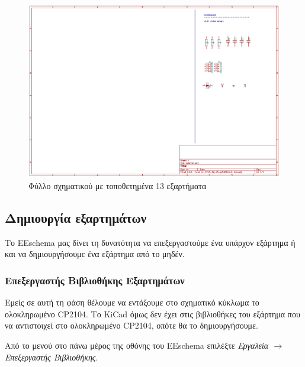 \documentclass[a4paper]{article}
\begin{document}
\begin{figure}
  \begin{center}
    \includegraphics[width=.9\textwidth]{img/eesch-circ-placedccompcop.png}
    \caption{Φύλλο σχηματικού με τοποθετημένα 13 εξαρτήματα}
    \label{fig:eesch-circ-placedccompcop}
  \end{center}
\end{figure}


\subsection{Δημιουργία εξαρτημάτων}
Το \textenglish{EEschema} μας δίνει τη δυνατότητα να επεξεργαστούμε ένα υπάρχον εξάρτημα ή και να δημιουργήσουμε ένα εξάρτημα από το μηδέν.

\subsubsection{Επεξεργαστής Βιβλιοθήκης Εξαρτημάτων}

Εμείς σε αυτή τη φάση θέλουμε να εντάξουμε στο σχηματικό κύκλωμα το ολοκληρωμένο CP2104. Το \textenglish{KiCad} όμως δεν έχει στις βιβλιοθήκες του εξάρτημα που να αντιστοιχεί στο ολοκληρωμένο CP2104, οπότε θα το δημιουργήσουμε.

Από το μενού στο πάνω μέρος της οθόνης του \textenglish{EEschema} επιλέξτε \textit{Εργαλεία $\rightarrow$ Επεξεργαστής Βιβλιοθήκης}.
\end{document}
